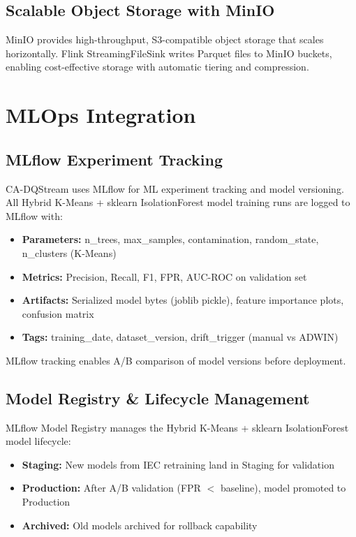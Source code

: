 \subsection{Scalable Object Storage with MinIO}

MinIO provides high-throughput, S3-compatible object storage that scales horizontally. Flink StreamingFileSink writes Parquet files to MinIO buckets, enabling cost-effective storage with automatic tiering and compression.


\section{MLOps Integration}

\subsection{MLflow Experiment Tracking}

CA-DQStream uses MLflow \citep{mlflow2024} for ML experiment tracking and model versioning. All Hybrid K-Means + sklearn IsolationForest model training runs are logged to MLflow with:

\begin{itemize}
    \item \textbf{Parameters:} n\_trees, max\_samples, contamination, random\_state, n\_clusters (K-Means)
    \item \textbf{Metrics:} Precision, Recall, F1, FPR, AUC-ROC on validation set
    \item \textbf{Artifacts:} Serialized model bytes (joblib pickle), feature importance plots, confusion matrix
    \item \textbf{Tags:} training\_date, dataset\_version, drift\_trigger (manual vs ADWIN)
\end{itemize}

MLflow tracking enables A/B comparison of model versions before deployment.

\subsection{Model Registry \& Lifecycle Management}

MLflow Model Registry manages the Hybrid K-Means + sklearn IsolationForest model lifecycle:

\begin{itemize}
    \item \textbf{Staging:} New models from IEC retraining land in Staging for validation
    \item \textbf{Production:} After A/B validation (FPR $<$ baseline), model promoted to Production
    \item \textbf{Archived:} Old models archived for rollback capability
\end{itemize}


